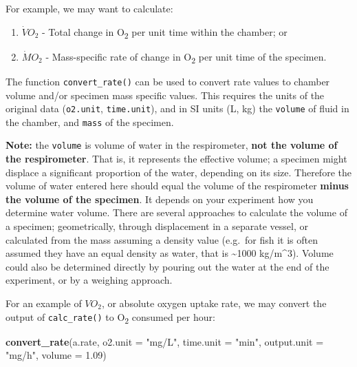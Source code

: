 \documentclass[]{book}
\newenvironment{Shaded}{\begin{snugshade}}{\end{snugshade}}
\newcommand{\KeywordTok}[1]{\textcolor[rgb]{0.13,0.29,0.53}{\textbf{#1}}}
\newcommand{\DataTypeTok}[1]{\textcolor[rgb]{0.13,0.29,0.53}{#1}}
\newcommand{\FloatTok}[1]{\textcolor[rgb]{0.00,0.00,0.81}{#1}}
\newcommand{\StringTok}[1]{\textcolor[rgb]{0.31,0.60,0.02}{#1}}
\newcommand{\NormalTok}[1]{#1}
\providecommand{\tightlist}{%
  \setlength{\itemsep}{0pt}\setlength{\parskip}{0pt}}
\begin{document}
For example, we may want to calculate:

\begin{enumerate}
\def\labelenumi{\arabic{enumi}.}
\tightlist
\item
  \(\dot{V}O_2\) - Total change in O\textsubscript{2} per unit time
  within the chamber; or
\item
  \(\dot{M}O_2\) - Mass-specific rate of change in O\textsubscript{2}
  per unit time of the specimen.
\end{enumerate}

The function \texttt{convert\_rate()} can be used to convert rate values
to chamber volume and/or specimen mass specific values. This requires
the units of the original data (\texttt{o2.unit}, \texttt{time.unit}),
and in SI units (L, kg) the \texttt{volume} of fluid in the chamber, and
\texttt{mass} of the specimen.

\textbf{Note:} the \texttt{volume} is volume of water in the
respirometer, \textbf{not the volume of the respirometer}. That is, it
represents the effective volume; a specimen might displace a significant
proportion of the water, depending on its size. Therefore the volume of
water entered here should equal the volume of the respirometer
\textbf{minus the volume of the specimen}. It depends on your experiment
how you determine water volume. There are several approaches to
calculate the volume of a specimen; geometrically, through displacement
in a separate vessel, or calculated from the mass assuming a density
value (e.g.~for fish it is often assumed they have an equal density as
water, that is \textasciitilde{}1000 kg/m\^{}3). Volume could also be
determined directly by pouring out the water at the end of the
experiment, or by a weighing approach.

For an example of \(VO_2\), or absolute oxygen uptake rate, we may
convert the output of \texttt{calc\_rate()} to O\textsubscript{2}
consumed per hour:

\begin{Shaded}
\begin{Highlighting}[]
\KeywordTok{convert_rate}\NormalTok{(a.rate, }
             \DataTypeTok{o2.unit =} \StringTok{"mg/L"}\NormalTok{, }
             \DataTypeTok{time.unit =} \StringTok{"min"}\NormalTok{, }
             \DataTypeTok{output.unit =} \StringTok{"mg/h"}\NormalTok{, }
             \DataTypeTok{volume =} \FloatTok{1.09}\NormalTok{)}
\end{Highlighting}
\end{Shaded}
\end{document}
